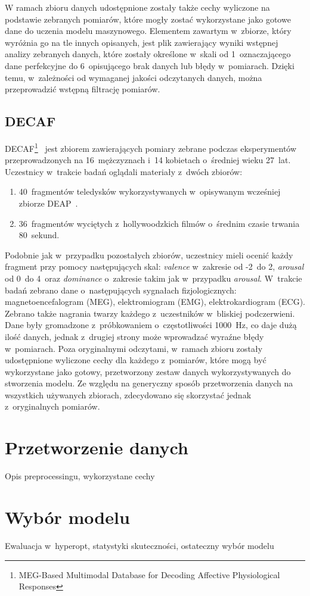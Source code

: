 W ramach zbioru danych udostępnione zostały także cechy wyliczone na podstawie zebranych pomiarów, które mogły zostać wykorzystane jako gotowe dane do uczenia modelu maszynowego. Elementem zawartym w~zbiorze, który wyróżnia go na tle innych opisanych, jest plik zawierający wyniki wstępnej analizy zebranych danych, które zostały określone w~skali od 1~oznaczającego dane perfekcyjne do 6~opisującego brak danych lub błędy w~pomiarach. Dzięki temu, w~zależności od wymaganej jakości odczytanych danych, można przeprowadzić wstępną filtrację pomiarów.

\subsection{DECAF}
DECAF\footnote{MEG-Based Multimodal Database for Decoding Affective Physiological Responses}~\cite{decaf_dataset_2015} jest zbiorem zawierających pomiary zebrane podczas eksperymentów przeprowadzonych na 16~mężczyznach i~14 kobietach o~średniej wieku 27~lat. Uczestnicy w~trakcie badań oglądali materiały z~dwóch zbiorów:
\begin{enumerate}
	\item  40~fragmentów teledysków wykorzystywanych w~opisywanym wcześniej zbiorze DEAP~\cite{deap_dataset_2011}.
	\item 36~fragmentów wyciętych z~hollywoodzkich filmów o~średnim czasie trwania 80~sekund.
\end{enumerate}
Podobnie jak w~przypadku pozostałych zbiorów, uczestnicy mieli ocenić każdy fragment przy pomocy następujących skal: \textit{valence} w~zakresie od -2~do 2, \textit{arousal} od 0~do 4~oraz \textit{dominance} o~zakresie takim jak w~przypadku \textit{arousal}. W~trakcie badań zebrano dane o~następujących sygnałach fizjologicznych: magnetoencefalogram (MEG), elektromiogram (EMG), elektrokardiogram (ECG). Zebrano także nagrania twarzy każdego z~uczestników w~bliskiej podczerwieni. Dane były gromadzone z~próbkowaniem o~częstotliwości 1000~Hz, co daje dużą ilość danych, jednak z~drugiej strony może wprowadzać wyraźne błędy w~pomiarach. Poza oryginalnymi odczytami, w~ramach zbioru zostały udostępnione wyliczone cechy dla każdego z~pomiarów, które mogą być wykorzystane jako gotowy, przetworzony zestaw danych wykorzystywanych do stworzenia modelu. Ze względu na generyczny sposób przetworzenia danych na wszystkich używanych zbiorach, zdecydowano się skorzystać jednak z~oryginalnych pomiarów. 

\section{Przetworzenie danych}
Opis preprocessingu, wykorzystane cechy
\section{Wybór modelu}
Ewaluacja w~hyperopt, statystyki skuteczności, ostateczny wybór modelu